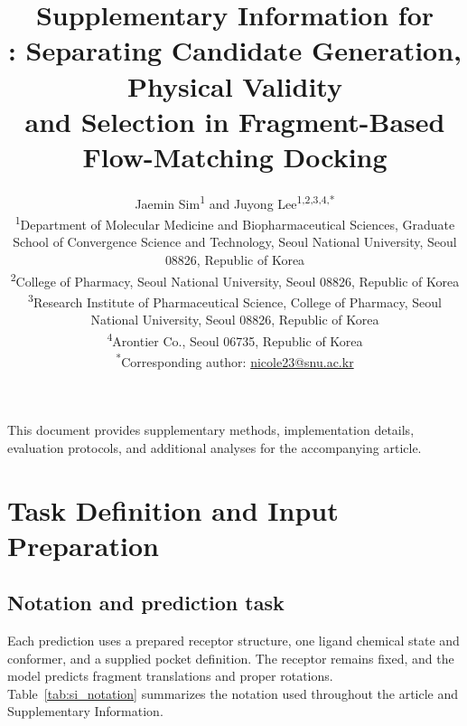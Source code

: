 \documentclass{article}
\title{Supplementary Information for\\
\method: Separating Candidate Generation, Physical Validity\\
and Selection in Fragment-Based Flow-Matching Docking}
\author{\parbox{0.96\textwidth}{\centering
Jaemin Sim\textsuperscript{1} and Juyong Lee\textsuperscript{1,2,3,4,*}\\[0.75em]
\small\textsuperscript{1}Department of Molecular Medicine and Biopharmaceutical Sciences, Graduate School of Convergence Science and Technology, Seoul National University, Seoul 08826, Republic of Korea\\
\small\textsuperscript{2}College of Pharmacy, Seoul National University, Seoul 08826, Republic of Korea\\
\small\textsuperscript{3}Research Institute of Pharmaceutical Science, College of Pharmacy, Seoul National University, Seoul 08826, Republic of Korea\\
\small\textsuperscript{4}Arontier Co., Seoul 06735, Republic of Korea\\[0.5em]
\small\textsuperscript{*}Corresponding author: \href{mailto:nicole23@snu.ac.kr}{nicole23@snu.ac.kr}
}}
\date{}
\begin{document}
\maketitle

\noindent This document provides supplementary methods, implementation details, evaluation protocols, and additional analyses for the accompanying article.

\section{Task Definition and Input Preparation}
\label{si:end_to_end_contract}
\label{si:contract}

\subsection{Notation and prediction task}

Each prediction uses a prepared receptor structure, one ligand chemical state and conformer, and a supplied pocket definition.
The receptor remains fixed, and the model predicts fragment translations and proper rotations.
Table~\ref{tab:si_notation} summarizes the notation used throughout the article and Supplementary Information.
\end{document}
